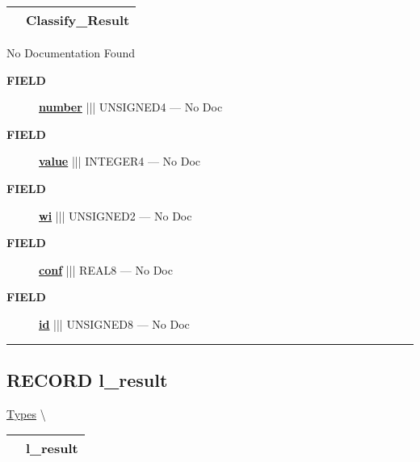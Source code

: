 {\renewcommand{\arraystretch}{1.5}
\begin{tabularx}{\textwidth}{|>{\raggedright\arraybackslash}l|X|}
\hline
\hspace{0pt}\mytexttt{\color{red} } & \textbf{Classify\_Result} \\
\hline
\end{tabularx}
}

\par





No Documentation Found







\par
\begin{description}
\item [\colorbox{tagtype}{\color{white} \textbf{\textsf{FIELD}}}] \textbf{\underline{number}} ||| UNSIGNED4 --- No Doc
\item [\colorbox{tagtype}{\color{white} \textbf{\textsf{FIELD}}}] \textbf{\underline{value}} ||| INTEGER4 --- No Doc
\item [\colorbox{tagtype}{\color{white} \textbf{\textsf{FIELD}}}] \textbf{\underline{wi}} ||| UNSIGNED2 --- No Doc
\item [\colorbox{tagtype}{\color{white} \textbf{\textsf{FIELD}}}] \textbf{\underline{conf}} ||| REAL8 --- No Doc
\item [\colorbox{tagtype}{\color{white} \textbf{\textsf{FIELD}}}] \textbf{\underline{id}} ||| UNSIGNED8 --- No Doc
\end{description}





\rule{\linewidth}{0.5pt}
\subsection*{\textsf{\colorbox{headtoc}{\color{white} RECORD}
l\_result}}

\hypertarget{ecldoc:ml_core.types.l_result}{}
\hspace{0pt} \hyperlink{ecldoc:ML_Core.Types}{Types} \textbackslash 

{\renewcommand{\arraystretch}{1.5}
\begin{tabularx}{\textwidth}{|>{\raggedright\arraybackslash}l|X|}
\hline
\hspace{0pt}\mytexttt{\color{red} } & \textbf{l\_result} \\
\hline
\end{tabularx}
}


